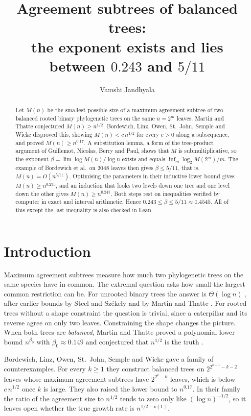 \documentclass[11pt]{amsart}
\title[Agreement subtrees of balanced trees]{Agreement subtrees of balanced trees:\\ the exponent exists and lies between $0.243$ and $5/11$}
\author{Vamshi Jandhyala}
\theoremstyle{definition}
\begin{document}
\begin{abstract}
Let $M(n)$ be the smallest possible size of a maximum agreement subtree of two balanced rooted
binary phylogenetic trees on the same $n=2^m$ leaves. Martin and Thatte conjectured
$M(n)\ge n^{1/2}$. Bordewich, Linz, Owen, St.~John, Semple and Wicke disproved this, showing
$M(n)<c\,n^{1/2}$ for every $c>0$ along a subsequence, and proved $M(n)\ge n^{0.17}$.
A substitution lemma, a form of the tree-product argument of Guillemot, Nicolas, Berry and Paul,
shows that $M$ is submultiplicative, so the exponent
$\beta=\lim \log M(n)/\log n$ exists and equals $\inf_m \log_2 M(2^m)/m$. The example of Bordewich et al.\ on
$2048$ leaves then gives $\beta\le 5/11$, that is, $M(n)=O(n^{5/11})$. Optimising the
parameters in their inductive lower bound gives $M(n)\ge n^{0.235}$, and an induction that looks
two levels down one tree and one level down the other gives $M(n)\ge n^{0.243}$. Both steps rest on
inequalities verified by computer in exact and interval arithmetic. Hence
$0.243\le\beta\le 5/11\approx 0.4545$. All of this except the last inequality is also checked in Lean.
\end{abstract}

\maketitle

\section{Introduction}

Maximum agreement subtrees measure how much two phylogenetic trees on the same species have in
common. The extremal question asks how small the largest common restriction can be. For
unrooted binary trees the answer is $\Theta(\log n)$ \cite{Markin}, after earlier bounds by
Steel and Sz\'ekely \cite{SS} and by Martin and Thatte \cite{MT}. For rooted trees without a
shape constraint the question is trivial, since a caterpillar and its reverse agree on only
two leaves. Constraining the shape changes the picture. When both trees are \emph{balanced},
Martin and Thatte proved a polynomial lower bound $n^{\beta_0}$ with $\beta_0\approx 0.149$ and
conjectured that $n^{1/2}$ is the truth \cite[Conjecture~20]{MT}.

Bordewich, Linz, Owen, St.~John, Semple and Wicke \cite{BLOSSW} gave a family of counterexamples.
For every $k\ge1$ they construct balanced trees on $2^{2^{k+1}-k-2}$ leaves whose maximum
agreement subtrees have $2^{2^k-k}$ leaves, which is below $c\,n^{1/2}$ once $k$ is large. They
also raised the lower bound to $n^{0.17}$. In their family the ratio of the agreement size to $n^{1/2}$ tends to zero
only like $(\log n)^{-1/2}$, so it leaves open whether the true growth rate is $n^{1/2-o(1)}$.
\end{document}
